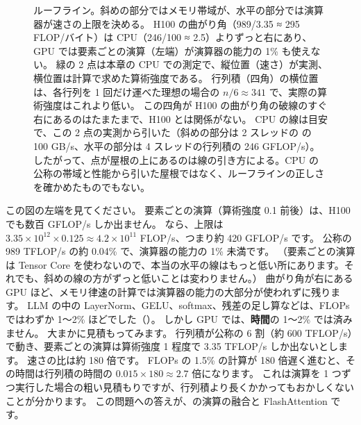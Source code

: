 \begin{figure}[!tbp]
\centering
{}
\caption{ルーフライン。斜めの部分ではメモリ帯域が、水平の部分では演算器が速さの上限を決める。
H100 の曲がり角（989/3.35 ≈ 295 FLOP/バイト）は CPU（246/100 ≈ 2.5）よりずっと右にあり、GPU では要素ごとの演算（左端）が演算器の能力の 1\% も使えない。
緑の 2 点は本章の CPU での測定で、縦位置（速さ）が実測、横位置は計算で求めた算術強度である。
行列積（四角）の横位置は、各行列を 1 回だけ運べた理想の場合の $n/6\approx341$ で、実際の算術強度はこれより低い。
この四角が H100 の曲がり角の破線のすぐ右にあるのはたまたまで、H100 とは関係がない。
CPU の線は目安で、この 2 点の実測から引いた（斜めの部分は 2 スレッドの  の 100 GB/s、水平の部分は 4 スレッドの行列積の 246 GFLOP/s）。
したがって、点が屋根の上にあるのは線の引き方による。CPU の公称の帯域と性能から引いた屋根ではなく、ルーフラインの正しさを確かめたものでもない。}
\label{fig:gpu-roofline}
\end{figure}

この図の左端を見てください。
要素ごとの演算（算術強度 0.1 前後）は、H100 でも数百 GFLOP/s しか出ません。
 なら、上限は $3.35\times10^{12}\times0.125\approx4.2\times10^{11}$ FLOP/s、つまり約 420 GFLOP/s です。
公称の 989 TFLOP/s の約 0.04\% で、演算器の能力の 1\% 未満です。
（要素ごとの演算は Tensor Core を使わないので、本当の水平の線はもっと低い所にあります。それでも、斜めの線の方がずっと低いことは変わりません。）
曲がり角が右にある GPU ほど、メモリ律速の計算では演算器の能力の大部分が使われずに残ります。
LLM の中の LayerNorm、GELU、softmax、残差の足し算などは、FLOPs ではわずか 1〜2\% ほどでした（）。
しかし GPU では、\textbf{時間}の 1〜2\% では済みません。
大まかに見積もってみます。
行列積が公称の 6 割（約 600 TFLOP/s）で動き、要素ごとの演算は算術強度 1 程度で 3.35 TFLOP/s しか出ないとします。
速さの比は約 180 倍です。
FLOPs の 1.5\% の計算が 180 倍遅く進むと、その時間は行列積の時間の $0.015\times180\approx2.7$ 倍になります。
これは演算を 1 つずつ実行した場合の粗い見積もりですが、行列積より長くかかってもおかしくないことが分かります。
この問題への答えが、の演算の融合と FlashAttention です。

